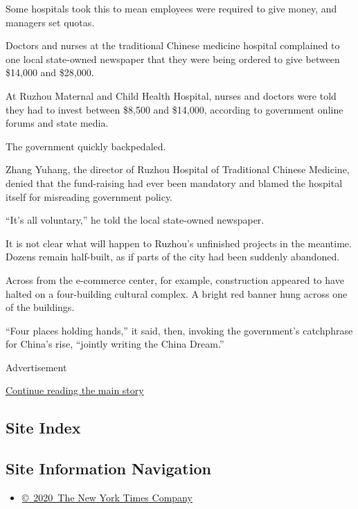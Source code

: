 Some hospitals took this to mean employees were required to give money,
and managers set quotas.

Doctors and nurses at the traditional Chinese medicine hospital
complained to one local state-owned newspaper that they were being
ordered to give between \$14,000 and \$28,000.

At Ruzhou Maternal and Child Health Hospital, nurses and doctors were
told they had to invest between \$8,500 and \$14,000, according to
government online forums and state media.

The government quickly backpedaled.

Zhang Yuhang, the director of Ruzhou Hospital of Traditional Chinese
Medicine, denied that the fund-raising had ever been mandatory and
blamed the hospital itself for misreading government policy.

``It's all voluntary,'' he told the local state-owned newspaper.

It is not clear what will happen to Ruzhou's unfinished projects in the
meantime. Dozens remain half-built, as if parts of the city had been
suddenly abandoned.

Across from the e-commerce center, for example, construction appeared to
have halted on a four-building cultural complex. A bright red banner
hung across one of the buildings.

``Four places holding hands,'' it said, then, invoking the government's
catchphrase for China's rise, ``jointly writing the China Dream.''

Advertisement

\protect\hyperlink{after-bottom}{Continue reading the main story}

\hypertarget{site-index}{%
\subsection{Site Index}\label{site-index}}

\hypertarget{site-information-navigation}{%
\subsection{Site Information
Navigation}\label{site-information-navigation}}

\begin{itemize}
\tightlist
\item
  \href{https://help.nytimes3xbfgragh.onion/hc/en-us/articles/115014792127-Copyright-notice}{©~2020~The
  New York Times Company}
\end{itemize}

